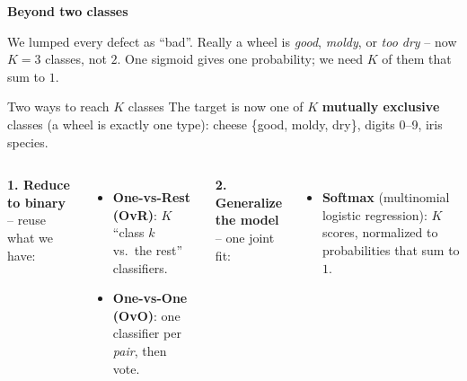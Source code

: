 \documentclass[aspectratio=169]{beamer}
\begin{document}
\begin{frame}[plain]
  \vfill
  \begin{center}
    {\Large\color{popblue}\textbf{Beyond two classes}}\\[0.9em]
    \begin{minipage}{0.82\textwidth}\centering\small
      We lumped every defect as ``bad''. Really a wheel is \emph{good}, \emph{moldy}, or
      \emph{too dry} -- now $K=3$ classes, not $2$. One sigmoid gives one probability;
      we need $K$ of them that sum to $1$.
    \end{minipage}
  \end{center}
  \vfill
\end{frame}

\begin{frame}{Two ways to reach $K$ classes}
  The target is now one of $K$ \textbf{mutually exclusive} classes (a wheel is exactly one
  type): cheese \{good, moldy, dry\}, digits 0--9, iris species.
  \vfill
  \begin{columns}[T]
    \textbf{1. Reduce to binary} -- reuse what we have:
    \begin{itemize}\small
      \item \textbf{One-vs-Rest (OvR)}: $K$ ``class $k$ vs.\ the rest'' classifiers.
      \item \textbf{One-vs-One (OvO)}: one classifier per \emph{pair}, then vote.
    \end{itemize}
    \textbf{2. Generalize the model} -- one joint fit:
    \begin{itemize}\small
      \item \textbf{Softmax} (multinomial logistic regression): $K$ scores, normalized to
        probabilities that sum to $1$.
    \end{itemize}
  \end{columns}
  \vfill
\end{frame}
\end{document}
